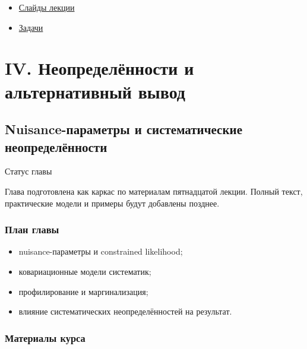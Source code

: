 \documentclass[
  russian,
  letterpaper,
]{scrbook}
\providecommand{\tightlist}{%
  \setlength{\itemsep}{0pt}\setlength{\parskip}{0pt}}
\begin{document}
\begin{itemize}
\tightlist
\item
  \href{https://neutrinohit.github.io/statistical-analysis-course/ru/slides/13_interval_estimation_and_limits.html}{Слайды
  лекции}
\item
  \href{https://neutrinohit.github.io/statistical-analysis-course/ru/slides/exercises/13_interval_estimation_and_limits_exercises.html}{Задачи}
\end{itemize}

\part{IV. Неопределённости и альтернативный вывод}

\chapter{Nuisance-параметры и систематические
неопределённости}\label{nuisance-ux43fux430ux440ux430ux43cux435ux442ux440ux44b-ux438-ux441ux438ux441ux442ux435ux43cux430ux442ux438ux447ux435ux441ux43aux438ux435-ux43dux435ux43eux43fux440ux435ux434ux435ux43bux451ux43dux43dux43eux441ux442ux438}

{Статус главы}

Глава подготовлена как каркас по материалам пятнадцатой лекции. Полный
текст, практические модели и примеры будут добавлены позднее.

\section{План
главы}\label{ux43fux43bux430ux43d-ux433ux43bux430ux432ux44b-13}

\begin{itemize}
\tightlist
\item
  nuisance-параметры и constrained likelihood;
\item
  ковариационные модели систематик;
\item
  профилирование и маргинализация;
\item
  влияние систематических неопределённостей на результат.
\end{itemize}

\section{Материалы
курса}\label{ux43cux430ux442ux435ux440ux438ux430ux43bux44b-ux43aux443ux440ux441ux430-12}
\end{document}
